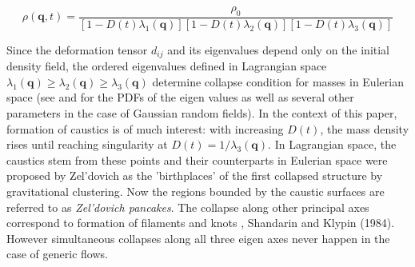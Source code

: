 \begin{equation}
 \rho(\mathbf{q}, t) = \frac{\rho_0}{ \left[1 - D(t) \lambda_1(\mathbf{q}) \right]\left[1 - D(t) \lambda_2(\mathbf{q}) \right]\left[1 - D(t) \lambda_3(\mathbf{q}) \right] }
\end{equation}

Since the deformation tensor $d_{ij}$ and its eigenvalues depend only on the initial density field, the ordered eigenvalues defined in Lagrangian space $\lambda_1(\mathbf{q}) \geq \lambda_2(\mathbf{q}) \geq \lambda_3(\mathbf{q})$ determine collapse condition for masses in Eulerian space (see \cite{Doroshkevich1970} and \cite{Lee1998} {for the PDFs  of the eigen values as well as several other parameters} in the case of Gaussian random fields). In the context of this paper, formation of caustics is of much interest: with increasing $D(t)$, the mass density rises until reaching singularity at $D(t) = 1/\lambda_3(\mathbf{q})$. In Lagrangian space, the caustics stem from these points and their counterparts  in Eulerian space were proposed by Zel'dovich as the 'birthplaces' of the first collapsed structure by gravitational clustering. Now the regions bounded by the caustic surfaces are referred to as {\it Zel'dovich pancakes}. The collapse along other principal axes correspond to formation of filaments and knots \citep{Arnold1982}, Shandarin and Klypin (1984). However simultaneous collapses along all three eigen axes never happen in the case of generic flows.


